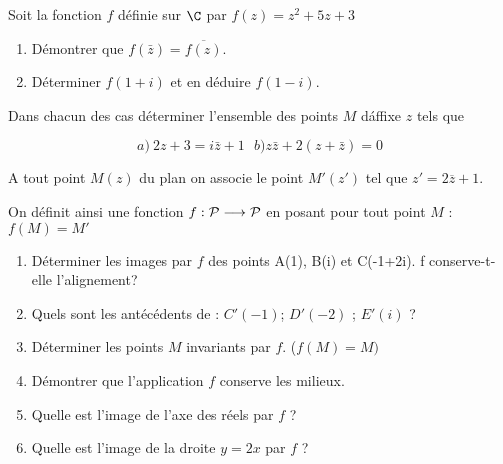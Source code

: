 \documentclass[a4paper,12pt]{article}
\renewcommand{\macible}[1]{}
\renewcommand{\notep}[1]{}
\begin{document}
\vspace{.2cm}
\EXO
Soit la fonction $f$ d\'efinie sur $\C$ par $f(z)=z^2+5z+3$
\begin{enumerate}
 \item D\'emontrer que $f(\bar{z})=\overline{f(z)}$.
 \item D\'eterminer $f(1+i)$ et en d\'eduire $f(1-i)$.
\end{enumerate}


\macible{exoconjugalg}{}

\vspace{.2cm}
\EXO
Dans chacun des cas d\'eterminer l'ensemble des points $M$ d\'affixe $z$ tels que
 
$$a)\ 2z+3=i\bar{z}+1\ \ \ b) z\bar{z}+2(z+\bar{z})=0$$


\vspace{.2cm}
\EXO


A tout point $M(z)$ du plan on associe le point $M'(z')$ tel que
$z'=2\overline{z}+1.$

On d\'efinit ainsi une fonction $f : {\cal P} \longrightarrow {\cal P}$ en posant pour tout point $M$ : $f(M)=M'$


\begin{enumerate}
\item D\'eterminer les images par $f$ des points A(1), B(i) et C(-1+2i). f conserve-t-elle l'alignement?  
\item Quels sont les ant\'ec\'edents de : $C'(-1)$; $D'(-2)$ ; $E'(i)$ ?


\item D\'eterminer les points $M$ invariants par $f$. ($f(M)=M)$
\item D\'emontrer que l'application $f$ conserve les milieux.
\item Quelle est l'image de l'axe des r\'eels par $f$ ?
\item Quelle est l'image de la droite  $y=2x$ par $f$ ?
\end{enumerate}


\notep{il manque des exos employant $z\in \R \iff z=\bar{z}$}

\notep{peut-être ajouter encore des exos de bases}
\end{document}
